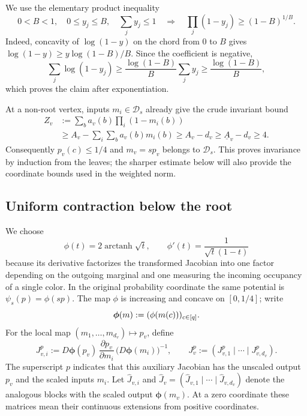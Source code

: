 We use the elementary product inequality
\begin{equation}
  0<B<1,\quad 0\le y_j\le B,\quad \sum_jy_j\le1
  \quad\Longrightarrow\quad
  \prod_j(1-y_j)\ge(1-B)^{1/B}.
  \label{eq:hg-product-lemma}
\end{equation}
Indeed, concavity of $\log(1-y)$ on the chord from $0$ to $B$ gives
$\log(1-y)\ge y\log(1-B)/B$.  Since the coefficient is negative,
\[
 \sum_j\log(1-y_j)
 \ge\frac{\log(1-B)}B\sum_jy_j
 \ge\frac{\log(1-B)}B,
\]
which proves the claim after exponentiation.

At a non-root vertex, inputs
\(m_i\in\mathcal D_s\) already give the crude invariant bound
\begin{equation}
\begin{aligned}
 Z_v
 &:=\sum_b a_v(b)\prod_i(1-m_i(b))\\
 &\ge A_v-\sum_i\sum_b a_v(b)m_i(b)
 \ge A_v-d_v\ge\underline A_v-d_v\ge4.
\end{aligned}
\label{eq:hg-Z-four}
\end{equation}
Consequently \(p_v(c)\le1/4\) and \(m_v=sp_v\) belongs to
\(\mathcal D_s\).  This proves invariance by induction from the leaves;
the sharper estimate below will also provide the coordinate bounds used in
the weighted norm.

\subsection{Uniform contraction below the root}
\label{sec:hg-nonroot-contraction}

We choose
\begin{equation}
  \phi(t)=2\operatorname{arctanh}\sqrt t,
  \qquad
  \phi'(t)=\frac1{\sqrt t(1-t)}
  \label{eq:hg-potential}
\end{equation}
because its derivative factorizes the transformed Jacobian into one factor
depending on the outgoing marginal and one measuring the incoming occupancy
of a single color.  In the original probability coordinate the same
potential is \(\psi_s(p)=\phi(sp)\).  The map \(\phi\) is
increasing and concave on \([0,1/4]\); write
\[
  \boldsymbol\phi(m):=(\phi(m(c)))_{c\in[q]}.
\]
For the local map \((m_1,\ldots,m_{d_v})\mapsto p_v\), define
\[
 J^p_{v,i}
 :=D\boldsymbol\phi(p_v)\,
     \frac{\partial p_v}{\partial m_i}\,
     \bigl(D\boldsymbol\phi(m_i)\bigr)^{-1},
 \qquad
 J^p_v:=(J^p_{v,1}\mid\cdots\mid J^p_{v,d_v}).
\]
The superscript \(p\) indicates that this auxiliary Jacobian has the
unscaled output \(p_v\) and the scaled inputs \(m_i\).
Let \(\widehat J_{v,i}\) and
\(\widehat J_v=(\widehat J_{v,1}\mid\cdots\mid\widehat J_{v,d_v})\)
denote the analogous blocks with the scaled output \(\boldsymbol\phi(m_v)\).  At a zero
coordinate these matrices mean their continuous extensions from positive
coordinates.

